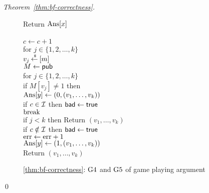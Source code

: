 \begin{proof}[Theorem~\ref{thm:bf-correctness}]
\begin{figure}[tp]
{{Return $\mathrm{Ans}[x]$\\
%
}
{
\\
$c \gets c + 1$\\
for $j \in \{1,2,\ldots,k\}$\\
\nudge $v_j {\:\stackrel{{\scriptscriptstyle \hspace{0.2em}\$}} {\leftarrow}\:} [m]$\\
%
$M \gets{\sf pub}$\\
for $j \in \{1,2,\ldots,k\}$\\
\nudge if $M[v_j] \neq 1$ then \\
\nudge \nudge $\mathrm{Ans}[y] \gets (0, (v_1, \ldots, v_{k}) )$\\
\nudge \nudge if $c \in {\cal I}$ then $\mathsf{bad} \gets \mathsf{true}$\\
\nudge \nudge $\mathrm{break}$\\
if $j < k$ then Return $\left(v_1,\ldots,v_k\right)$\\
if $c \notin {\cal I}$ then $\mathsf{bad} \gets \mathsf{true}$\\
$\mathrm{err} \gets \mathrm{err} +1$\\
$\mathrm{Ans}[y] \gets (1, (v_1, \ldots, v_{k}))$\\
Return $\left(v_1,\ldots,v_k\right)$
}
}
\caption{\ref{thm:bf-correctness}: $\text{G4}$ and $\text{G5}$ of game
  playing argument}
\label{fig:bf-correctness-games2}
\end{figure}
\hfill\qed
\end{proof}
